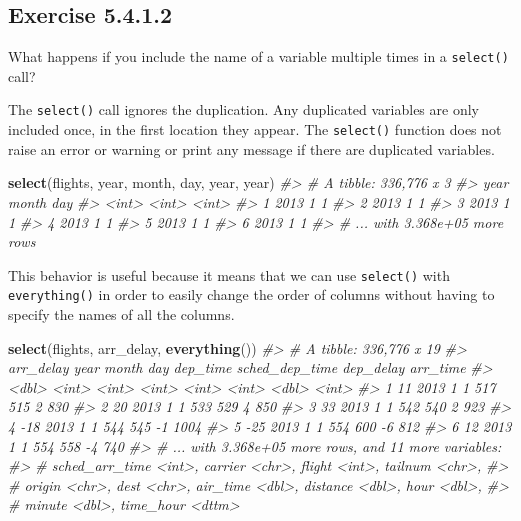 \documentclass[]{book}
\newenvironment{Shaded}{\begin{snugshade}}{\end{snugshade}}
\newcommand{\CommentTok}[1]{\textcolor[rgb]{0.56,0.35,0.01}{\textit{#1}}}
\newcommand{\KeywordTok}[1]{\textcolor[rgb]{0.13,0.29,0.53}{\textbf{#1}}}
\newcommand{\NormalTok}[1]{#1}
\theoremstyle{plain}
\theoremstyle{remark}
\begin{document}
\hypertarget{exercise-5.4.1.2}{%
\subsection*{\texorpdfstring{Exercise
{5.4.1.2}}{Exercise 5.4.1.2}}\label{exercise-5.4.1.2}}

What happens if you include the name of a variable multiple times in a
\texttt{select()} call?

The \texttt{select()} call ignores the duplication. Any duplicated
variables are only included once, in the first location they appear. The
\texttt{select()} function does not raise an error or warning or print
any message if there are duplicated variables.

\begin{Shaded}
\begin{Highlighting}[]
\KeywordTok{select}\NormalTok{(flights, year, month, day, year, year)}
\CommentTok{#> # A tibble: 336,776 x 3}
\CommentTok{#>    year month   day}
\CommentTok{#>   <int> <int> <int>}
\CommentTok{#> 1  2013     1     1}
\CommentTok{#> 2  2013     1     1}
\CommentTok{#> 3  2013     1     1}
\CommentTok{#> 4  2013     1     1}
\CommentTok{#> 5  2013     1     1}
\CommentTok{#> 6  2013     1     1}
\CommentTok{#> # ... with 3.368e+05 more rows}
\end{Highlighting}
\end{Shaded}

This behavior is useful because it means that we can use
\texttt{select()} with \texttt{everything()} in order to easily change
the order of columns without having to specify the names of all the
columns.

\begin{Shaded}
\begin{Highlighting}[]
\KeywordTok{select}\NormalTok{(flights, arr_delay, }\KeywordTok{everything}\NormalTok{())}
\CommentTok{#> # A tibble: 336,776 x 19}
\CommentTok{#>   arr_delay  year month   day dep_time sched_dep_time dep_delay arr_time}
\CommentTok{#>       <dbl> <int> <int> <int>    <int>          <int>     <dbl>    <int>}
\CommentTok{#> 1        11  2013     1     1      517            515         2      830}
\CommentTok{#> 2        20  2013     1     1      533            529         4      850}
\CommentTok{#> 3        33  2013     1     1      542            540         2      923}
\CommentTok{#> 4       -18  2013     1     1      544            545        -1     1004}
\CommentTok{#> 5       -25  2013     1     1      554            600        -6      812}
\CommentTok{#> 6        12  2013     1     1      554            558        -4      740}
\CommentTok{#> # ... with 3.368e+05 more rows, and 11 more variables:}
\CommentTok{#> #   sched_arr_time <int>, carrier <chr>, flight <int>, tailnum <chr>,}
\CommentTok{#> #   origin <chr>, dest <chr>, air_time <dbl>, distance <dbl>, hour <dbl>,}
\CommentTok{#> #   minute <dbl>, time_hour <dttm>}
\end{Highlighting}
\end{Shaded}
\end{document}
